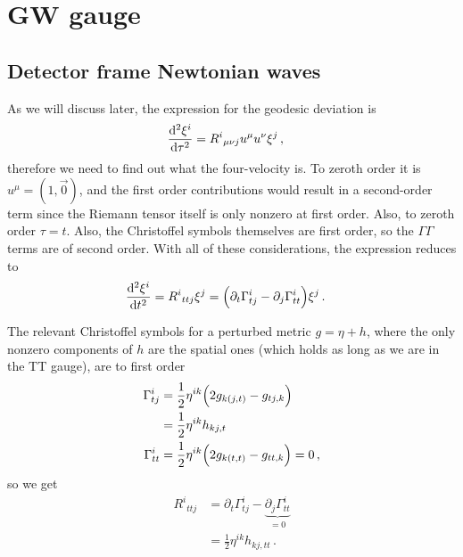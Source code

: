 \documentclass[main.tex]{subfiles}
\begin{document}
\section{GW gauge}

\subsection{Detector frame Newtonian waves}



As we will discuss later, the expression for the geodesic deviation is 
%
\begin{align}
\dv[2]{\xi^{i}}{\tau } &= R^{i}{}_{\mu \nu j} u^{\mu} u^{\nu } \xi^{j}
\,,
\end{align}
%
therefore we need to find out what the four-velocity is. To zeroth order it is \(u^{\mu } = (1, \vec{0})\), and the first order contributions would result in a second-order term since the Riemann tensor itself is only nonzero at first order. Also, to zeroth order \(\tau = t\).
Also, the Christoffel symbols themselves are first order, so the \(\Gamma \Gamma \) terms are of second order.
With all of these considerations, the expression reduces to
%
\begin{align}
\dv[2]{\xi^{i}}{t} &= R^{i}{}_{t t j} \xi^{j} = \qty( \partial_{t} \Gamma^{i}_{t j} - \partial_{j} \Gamma^{i}_{tt}) \xi^{j} 
\,.
\end{align}
%

The relevant Christoffel symbols for a perturbed metric \(g = \eta + h\), where the only nonzero components of \(h\) are the spatial ones (which holds as long as we are in the TT gauge), are to first order
%
\begin{align}
\Gamma^{i}_{t j } &= \frac{1}{2} \eta^{i k } 
\qty( 2 g_{k (j , t )} - g_{t j, k })  \\
&= \frac{1}{2} \eta^{ik} h_{kj, t}   \\
\Gamma^{i}_{tt} &= \frac{1}{2} \eta^{i k}
\qty( 2 g_{k (t, t)} - g_{tt, k} ) = 0
\,,
\end{align}
%
so we get 
%
\begin{align}
R^{i}{}_{t t j} &= \partial_{t} \Gamma^{i}_{t j} - \underbrace{\partial_{j} \Gamma^{i}_{tt}}_{ = 0}  \\
&= \frac{1}{2} \eta^{i k} h_{k j, tt}
\,.
\end{align}
\end{document}
